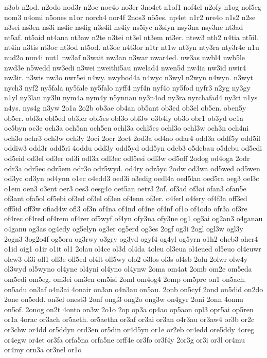 {n3ob
n2od.
n2odo
nod3r
n2oe
noe4o
no3er
3no4et
n1of1
nof4el
n2ofy
n1og
nol5eg
nom3
n4omi
n5ones
n1or
norch4
nor4f
2nos3
n^^f65es.
np4et
n1r2
nre4o
n1s2
n2se
n3sei
ns3en
ns3i
ns4ic
ns4ig
n3s4il
ns4iy
ns5iyc
n3siyn
nsy3na
nsy3ne
nt3ad
nt5af.
nt5aid
nt4ana
nt3aw
n2te
n3tei
nt3el
nt3em
nt3er.
ntew3
nth2
n4tia
nt5il.
nt4in
n3tis
nt3oc
nt3od
nt5od.
nt3oe
n4t3or
n1tr
nt1w
nt3yn
nty3ra
nty3r4e
n1u
nud2o
nun4i
nut1
nw3af
n3wait
nw3an
n3war
nwar4ed.
nw3as
nwbl4
nwb5le
nwd3e
n5wedd
nw3edi
n3wei
nweithi5au
nwelad4
nwen5d
nw4ia
nw3id
nwir4
nw3ir.
n3wis
nw3o
nwr5ei
n4wy.
nwybod4a
n4wyc
n3wyl
n2wyn
n4wyn.
n3wyt
nych3
nyf2
ny5fala
ny5fale
ny5falo
nyff4
nyf4n
nyf4o
ny5fod
nyfr3
n2yg
ny3gy
n1yl
ny3lan
ny3lu
nym4a
nym4y
n5ynnau
ny3n4od
ny3ra
nyrchafad4
ny3ri
n1ys
n4ys.
nys4g
n3yw
2o1a
2o2b
ob3ae
ob4an
ob5ant
ob3ed
ob3el
ob5en.
oben5y
ob5er.
obl3a
obl5ed
ob3ler
obl5es
obl3o
obl3w
o3b4ly
ob3o
obr1
ob3yd
oc1a
oc5byn
oc3e
och3a
och5an
och5en
ochl3a
ochl5es
ochl3o
ochl3w
och3n
och4ni
och3o
ochr3
och3w
och3y
2oci
2ocr
2oct
2od3a
od4ao
odar4
odd3a
oddf5y
odd5il
oddiw3
odd3r
odd5ri
4oddu
odd3y
odd5yd
odd5yn
odeb3
o5debau
o5debu
od5edi
od5eid
od3el
od3er
od3i
odl3a
odl3ec
odl5esi
odl3w
od5off
2odog
od4oga
2odr
odr3a
odr5ec
odr5em
odr3o
odr5wyd.
od4ry
odr5yc
2odw
od3wa
od5wed
od5wen
od3yc
od3yn
od4ynn
o1ec
o4edd3
oed3i
o3edig
oedl4a
oed5lan
oed5ra
oeg3
oel3c
o1em
oen3
o3ent
oer3
oes3
oesg4o
oet5an
oetr3
2of.
of3ad
of3ai
ofan3
ofan5e
of3ant
ofa5ol
of5ebi
of3ed
of3el
of3en
of4enn
of3er.
o4ferl
o4fery
of4f3a
off3ed
off5id
off3w
ofiad4w
ofl3
of3n
of4na
of4nd
of4ne
of4nf
of1o
of4odo
ofr3a
of3re
of4rec
of4red
of4rem
of4rer
of5wyf
of4yn
ofy3na
ofy3ne
og1
og3ai
og2an3
o4ganau
o4ganu
og3as
og4edy
og5elyn
og3er
og5erd
og3es
2ogf
og3i
2ogl
ogl3w
ogl3y
2ogn3
3og2o4f
og5oru
og3rwy
o3gry
og3yd
ogyf4
og4yl
og5yrn
o1h2
oheb3
oher4
o1id
oig1
o1ir
o1it
ol1
2olau
ol4ce
ol3d
ol4da
4oleu
ol3eua
ol4eued
ol5euo
ol4euwr
olew3
ol3i
oll1
oll3e
oll5ed
ol4lt
oll5wy
olo2
o3los
ol3s
ol4sb
2olu
2olwr
olw4y
ol3wyd
ol5wyno
ol4yne
ol4yni
ol4yno
ol4ynw
2oma
om4at
2omb
om2e
om5eda
om5edi
om5eg.
om3ei
om3en
om5isi
2oml
om4og4
2omp
om5pre
on1
on5ach.
on5adu
on3af
o4n3ai
4onair
on3an
o4n3au
on5au.
2onb
on5cyf
2ond
on5did
on2do
2one
on5edd.
on3el
onest3
2onf
ongl3
ong2o
ong3w
on4gyr
2oni
2onn
4onnu
on5of.
2onog
on2t
4onto
on3w
2o1o
2op
op3a
op4ao
op5aon
opl3
opr5ai
op5ren
or1a
4orac
or3ach
or5aeth.
or5aetha
or3af
or3ai
or3an
o4r3au
or3aw4
or3b
or2c
or3chw
or4dd
or5ddyn
ord3en
or5din
or4d5yn
or1e
or2eb
or4edd
ore5ddy
4oreg
or4egw
or4et
or3fa
orfa5na
orfa5ne
orff4e
or3fo
or3f4y
2or3g
or3i
or3l
or4mu
or4my
orn3a
or3nel
or1o
}
